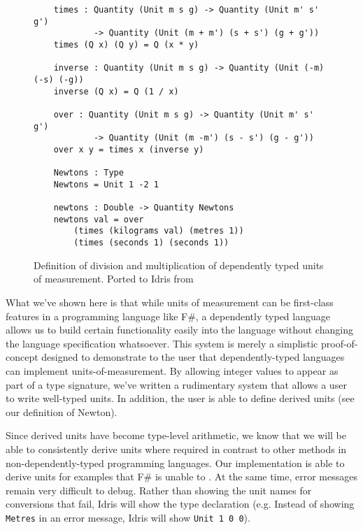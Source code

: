 \begin{figure}[h]
  \caption{Definition of division and multiplication of dependently typed units
  of measurement. Ported to Idris from \protect\cite{gundry2013}}
  \label{division}
  \begin{lstlisting}
    times : Quantity (Unit m s g) -> Quantity (Unit m' s' g') 
            -> Quantity (Unit (m + m') (s + s') (g + g'))
    times (Q x) (Q y) = Q (x * y)

    inverse : Quantity (Unit m s g) -> Quantity (Unit (-m) (-s) (-g))
    inverse (Q x) = Q (1 / x)

    over : Quantity (Unit m s g) -> Quantity (Unit m' s' g')
            -> Quantity (Unit (m -m') (s - s') (g - g'))
    over x y = times x (inverse y)

    Newtons : Type
    Newtons = Unit 1 -2 1

    newtons : Double -> Quantity Newtons
    newtons val = over 
        (times (kilograms val) (metres 1)) 
        (times (seconds 1) (seconds 1))
  \end{lstlisting}
\end{figure}

What we've shown here is that while units of measurement can be first-class
features in a programming language like F\#, a dependently typed language allows
us to build certain functionality easily into the language without changing the
language specification whatsoever. This system is merely a simplistic
proof-of-concept designed to demonstrate to the user that dependently-typed
languages can implement units-of-measurement. By allowing integer values to
appear as part of a type signature, we've written a rudimentary system that
allows a user to write well-typed units. In addition, the user is able to define
derived units (see our definition of Newton). 

Since derived units have become type-level arithmetic, we know that we will be
able to consistently derive units where required in contrast to other methods in
non-dependently-typed programming languages. Our implementation is able to
derive units for examples that F\# is unable to \cite{gundry2013}. At the same
time, error messages remain very difficult to debug. Rather than showing the
unit names for conversions that fail, Idris will show the type declaration (e.g.
Instead of showing \texttt{Metres} in an error message, Idris will show
\texttt{Unit 1 0 0}). 